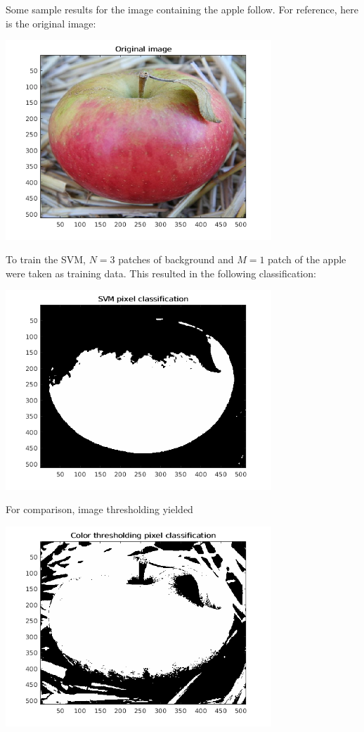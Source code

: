\documentclass[letterpaper,12pt]{article}
\begin{document}
\begin{enumerate}
  Some sample results for the image containing the apple follow. For
  reference, here is the original image:
  \begin{center}
    \includegraphics[width=10cm]{apple_orig.png}
  \end{center}
  To train the SVM, $N = 3$ patches of background and $M = 1$ patch of
  the apple were taken as training data. This resulted in the
  following classification:
  \begin{center}
    \includegraphics[width=10cm]{apple_svm.png}
  \end{center}
  For comparison, image thresholding yielded
  \begin{center}
    \includegraphics[width=10cm]{apple_color_thresh.png}

\end{center}
\end{enumerate}
\end{document}
